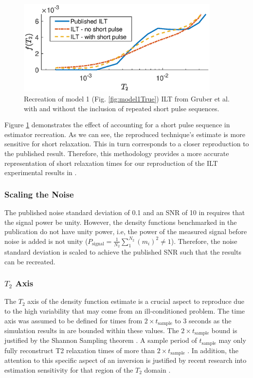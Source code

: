 \begin{figure}
    \centering
    \includegraphics[width = 0.9\textwidth]{implementation/recreate_short_pulse.eps}
    \caption{Recreation of model 1 (Fig. \ref{fig:model1True}) ILT from Gruber et al. \cite{GruberT2Estimation2013} with and without the inclusion of repeated short pulse sequences.}
    \label{fig:non_uniform_SNR}
\end{figure}
 Figure \ref{fig:non_uniform_SNR} demonstrates the effect of accounting for a short pulse sequence in estimator recreation. As we can see, the reproduced technique's estimate is more sensitive for short relaxation. This in turn corresponds to a closer reproduction to the published result. Therefore, this methodology provides a more accurate representation of short relaxation times for our reproduction of the ILT experimental results in \cite{GruberT2Estimation2013}.




\subsubsection{Scaling the Noise}
The published noise standard deviation of 0.1 and an SNR of 10  in \cite{GruberT2Estimation2013} requires that the signal power be unity. However, the density functions benchmarked in the publication do not have unity power, i.e, the power of the measured signal before noise is added is not unity ($P_{\text{signal}} = \frac{1}{N_2}\sum^{N_2}_1 (m_i)^2 \neq 1$). Therefore, the noise standard deviation is scaled to achieve the published SNR such that the results can be recreated.

\subsubsection{$T_2$ Axis}
The $T_2$ axis of the density function estimate is a crucial aspect to reproduce due to the high variability that may come from an ill-conditioned problem.
The time axis was assumed to be defined for times from $2\times t_\text{sample}$ to 3 seconds as the simulation results in \cite{GruberT2Estimation2013} are bounded within these values. The $2\times t_\text{sample}$ bound is justified by the Shannon Sampling theorem \cite{shannon1949communication}. A sample period of $t_\text{sample}$ may only fully reconstruct T2 relaxation times of more than $2\times t_\text{sample}$ . In addition, the attention to this specific aspect of an inversion is justified by recent research into estimation sensitivity for that region of the $T_2$ domain \cite{venkataramanan2015newPorosity}.

